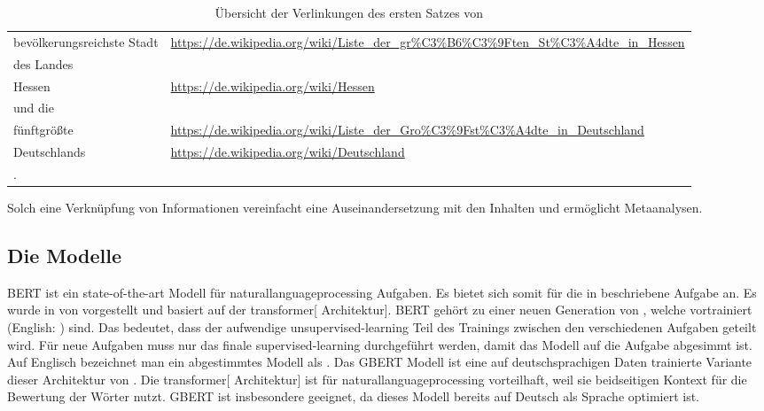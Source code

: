 \begin{table}
\begin{adjustbox}{max width=0.8\linewidth,}
\begin{tabularx}{\textwidth}{l l}
			bevölkerungsreichste Stadt & {\url{https://de.wikipedia.org/wiki/Liste_der_gr\%C3\%B6\%C3\%9Ften_St\%C3\%A4dte_in_Hessen}} \\
			des Landes                 &                                                                                               \\
			Hessen                     & {\url{https://de.wikipedia.org/wiki/Hessen}}                                                  \\
			und die                    &                                                                                               \\
			fünftgrößte                & {\url{https://de.wikipedia.org/wiki/Liste_der_Gro\%C3\%9Fst\%C3\%A4dte_in_Deutschland}}       \\
			Deutschlands               & {\url{https://de.wikipedia.org/wiki/Deutschland}}                                             \\
			.                          &
		\end{tabularx}
	\end{adjustbox}
	\caption{Übersicht der Verlinkungen des ersten Satzes von \autocite{dewiki:225740004}}
	\label{tbl:wikipedia:Frankfurt_am_Main:linking}
\end{table}

Solch eine Verknüpfung von Informationen
vereinfacht eine Auseinandersetzung mit den Inhalten
und ermöglicht Metaanalysen.

\subsection{Die Modelle}
\gls{BERT} ist ein state-of-the-art %
Modell
für \gls{naturallanguageprocessing} Aufgaben.\autocite{1810.04805}
Es bietet sich somit für die in  beschriebene Aufgabe an.
Es wurde in 
von \citeauthor{1810.04805}
vorgestellt und basiert auf der \gls{transformer}[ Architektur].\autocite{1810.04805}
\gls{BERT} gehört zu einer neuen Generation von ,
welche vortrainiert (English: ) sind.
Das bedeutet,
dass der aufwendige \gls{unsupervised-learning} Teil des Trainings
zwischen den verschiedenen Aufgaben geteilt wird.
Für neue Aufgaben muss nur das finale \gls{supervised-learning} durchgeführt werden,
damit das Modell auf die Aufgabe abgesimmt ist.
Auf Englisch bezeichnet man ein abgestimmtes Modell als .
Das \gls{GBERT} Modell ist eine auf deutschsprachigen Daten trainierte Variante
dieser Architektur von \citeauthor{2010.10906}.
\autocite{2010.10906}
Die \gls{transformer}[ Architektur]
ist für \gls{naturallanguageprocessing} vorteilhaft,
weil sie beidseitigen Kontext für die Bewertung der Wörter nutzt.
\gls{GBERT} ist insbesondere geeignet,
da dieses Modell bereits auf Deutsch als Sprache optimiert ist.


